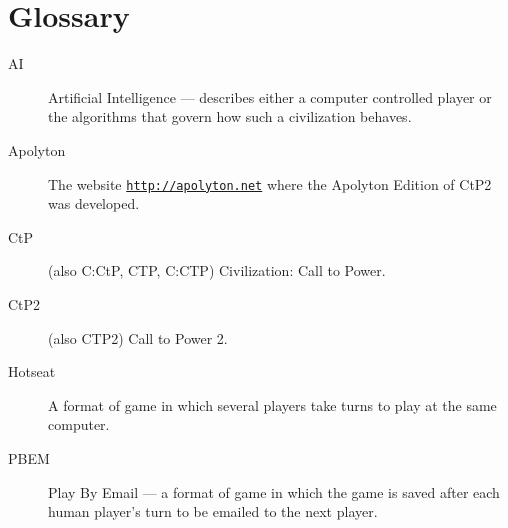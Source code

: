 \chapter{Glossary}
\begin{multicols}{2}
\begin{description}
\item[AI] Artificial Intelligence --- describes either a computer controlled
player or the algorithms that govern how such a civilization behaves.

\item[Apolyton] The website
\href{http://apolyton.net}{\texttt{http://apolyton.net}} where the Apolyton
Edition of CtP2 was developed.

\item[CtP] (also C:CtP, CTP, C:CTP) Civilization: Call to Power.

\item[CtP2] (also CTP2) Call to Power 2.

\item[Hotseat] A format of game in which several players take turns to play at
the same computer.

\item[PBEM] Play By Email --- a format of game in which the game is saved after
each human player's turn to be emailed to the next player.
\end{description}
\end{multicols}

